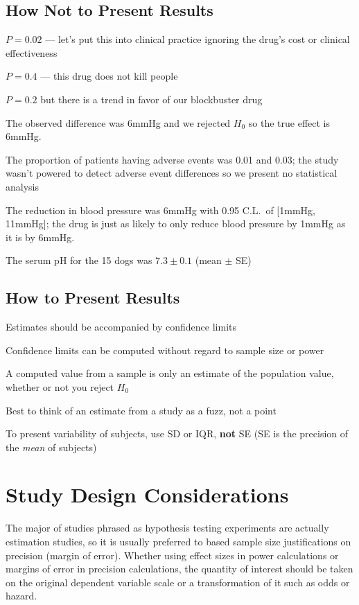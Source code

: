 \subsection{How Not to Present Results} 
\bi
\item $P=0.02$ --- let's put this into clinical practice ignoring the
  drug's cost or clinical effectiveness
\item $P=0.4$ --- this drug does not kill people
\item $P=0.2$ but there is a trend in favor of our blockbuster drug
\item The observed difference was 6mmHg and we rejected $H_0$ so the
  true effect is 6mmHg.
\item The proportion of patients having adverse events was 0.01 and
  0.03; the study wasn't powered to detect adverse event differences
  so we present no statistical analysis
\item The reduction in blood pressure was 6mmHg with 0.95 C.L.\ of
  [1mmHg, 11mmHg]; the drug is just as likely to only reduce blood
  pressure by 1mmHg as it is by 6mmHg.
\item The serum pH for the 15 dogs was $7.3 \pm 0.1$ (mean $\pm$ SE)
\ei

\subsection{How to Present Results} 
\bi
\item Estimates should be accompanied by confidence limits
\item Confidence limits can be computed without regard to sample size
  or power
\item A computed value from a sample is only an estimate of the
  population value, whether or not you reject $H_0$
\item Best to think of an estimate from a study as a fuzz, not a point
\item To present variability of subjects, use SD or IQR, \textbf{not}
  SE (SE is the precision of the \emph{mean} of subjects)
\ei

\section{Study Design Considerations}
The major of studies phrased as hypothesis testing experiments are
actually estimation studies, so it is usually preferred to based
sample size justifications on precision (margin of error).  Whether
using effect sizes in power calculations or margins of error in
precision calculations, the quantity of interest should be taken on
the original dependent variable scale or a transformation of it such
as odds or hazard.  

